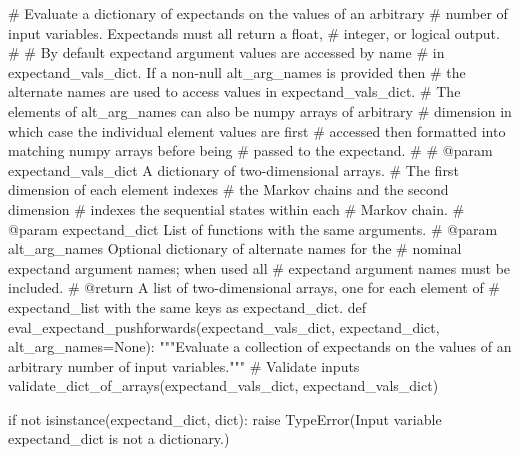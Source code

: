 \documentclass[
  letterpaper,
  DIV=11,
  numbers=noendperiod]{scrartcl}
\newenvironment{Shaded}{\begin{snugshade}}{\end{snugshade}}
\newcommand{\BuiltInTok}[1]{\textcolor[rgb]{0.00,0.23,0.31}{#1}}
\newcommand{\CommentTok}[1]{\textcolor[rgb]{0.37,0.37,0.37}{#1}}
\newcommand{\ControlFlowTok}[1]{\textcolor[rgb]{0.00,0.23,0.31}{#1}}
\newcommand{\KeywordTok}[1]{\textcolor[rgb]{0.00,0.23,0.31}{#1}}
\newcommand{\NormalTok}[1]{\textcolor[rgb]{0.00,0.23,0.31}{#1}}
\newcommand{\OperatorTok}[1]{\textcolor[rgb]{0.37,0.37,0.37}{#1}}
\newcommand{\PreprocessorTok}[1]{\textcolor[rgb]{0.68,0.00,0.00}{#1}}
\newcommand{\StringTok}[1]{\textcolor[rgb]{0.13,0.47,0.30}{#1}}
\newcommand{\VariableTok}[1]{\textcolor[rgb]{0.07,0.07,0.07}{#1}}
\begin{document}
\begin{Shaded}
\begin{Highlighting}[]
\CommentTok{\# Evaluate a dictionary of expectands on the values of an arbitrary}
\CommentTok{\# number of input variables.  Expectands must all return a float,}
\CommentTok{\# integer, or logical output.}
\CommentTok{\#}
\CommentTok{\# By default expectand argument values are accessed by name}
\CommentTok{\# in expectand\_vals\_dict.  If a non{-}null alt\_arg\_names is provided then}
\CommentTok{\# the alternate names are used to access values in expectand\_vals\_dict.}
\CommentTok{\# The elements of alt\_arg\_names can also be numpy arrays of arbitrary}
\CommentTok{\# dimension in which case the individual element values are first}
\CommentTok{\# accessed then formatted into matching numpy arrays before being}
\CommentTok{\# passed to the expectand.}
\CommentTok{\#}
\CommentTok{\# @param expectand\_vals\_dict A dictionary of two{-}dimensional arrays.}
\CommentTok{\#                            The first dimension of each element indexes}
\CommentTok{\#                            the Markov chains and the second dimension}
\CommentTok{\#                            indexes the sequential states within each}
\CommentTok{\#                            Markov chain.}
\CommentTok{\# @param expectand\_dict List of functions with the same arguments.}
\CommentTok{\# @param alt\_arg\_names Optional dictionary of alternate names for the}
\CommentTok{\#                      nominal expectand argument names; when used all}
\CommentTok{\#                      expectand argument names must be included.}
\CommentTok{\# @return A list of two{-}dimensional arrays, one for each element of}
\CommentTok{\#         expectand\_list with the same keys as expectand\_dict.}
\KeywordTok{def}\NormalTok{ eval\_expectand\_pushforwards(expectand\_vals\_dict,}
\NormalTok{                                expectand\_dict,}
\NormalTok{                                alt\_arg\_names}\OperatorTok{=}\VariableTok{None}\NormalTok{):}
  \CommentTok{"""Evaluate a collection of expectands on the values of an arbitrary}
\CommentTok{     number of input variables."""}
  \CommentTok{\# Validate inputs}
\NormalTok{  validate\_dict\_of\_arrays(expectand\_vals\_dict, }\StringTok{\textquotesingle{}expectand\_vals\_dict\textquotesingle{}}\NormalTok{)}

  \ControlFlowTok{if} \KeywordTok{not} \BuiltInTok{isinstance}\NormalTok{(expectand\_dict, }\BuiltInTok{dict}\NormalTok{):}
    \ControlFlowTok{raise} \PreprocessorTok{TypeError}\NormalTok{(}\StringTok{\textquotesingle{}Input variable \textasciigrave{}expectand\_dict\textasciigrave{} is \textquotesingle{}}
                    \StringTok{\textquotesingle{}not a dictionary.\textquotesingle{}}\NormalTok{)}


\end{Highlighting}
\end{Shaded}
\end{document}
